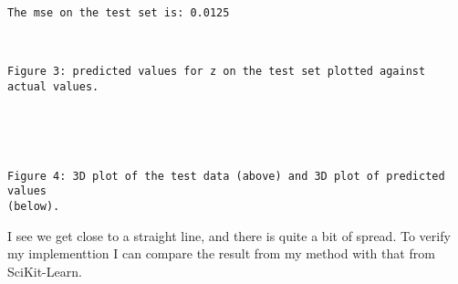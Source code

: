 \documentclass[11pt]{article}
\begin{document}
    \begin{Verbatim}[commandchars=\\\{\}]
The mse on the test set is: 0.0125
    \end{Verbatim}

    \begin{center}
    \end{center}
    { \hspace*{\fill} \\}
    
    \begin{Verbatim}[commandchars=\\\{\}]
Figure 3: predicted values for z on the test set plotted against actual values.
    \end{Verbatim}

    \begin{center}
    \end{center}
    { \hspace*{\fill} \\}
    
    \begin{center}
    \end{center}
    { \hspace*{\fill} \\}
    
    \begin{Verbatim}[commandchars=\\\{\}]
Figure 4: 3D plot of the test data (above) and 3D plot of predicted values
(below).
    \end{Verbatim}

    I see we get close to a straight line, and there is quite a bit of
spread. To verify my implementtion I can compare the result from my
method with that from SciKit-Learn.
\end{document}
